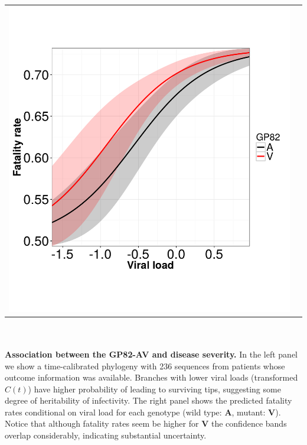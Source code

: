 \documentclass[portrait,a0paper,fontscale=0.3085]{baposter}
\begin{document}
\begin{poster}
{\begin{tabular}{cc}
 \includegraphics[scale=0.35,valign=c]{images/predicted_fatality_rates.pdf}
\end{tabular} \\
\\
\textbf{Association between the GP82-AV and disease severity.}
In the left panel we show a time-calibrated phylogeny with 236 sequences from patients whose outcome information was available.
Branches with lower viral loads (transformed $C(t)$) have higher probability of leading to surviving tips, suggesting some degree of heritability of infectivity.
The right panel shows the predicted fatality rates conditional on viral load for each genotype (wild type: \textbf{A}, mutant: \textbf{V}).
Notice that although fatality rates seem be higher for \textbf{V} the confidence bands overlap considerably, indicating substantial uncertainty.\\
\\
\begin{tabular}{ccc}

\end{tabular}}
\end{poster}
\end{document}
